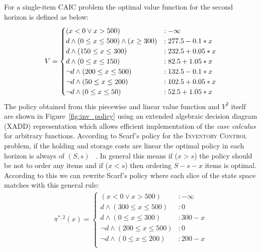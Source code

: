 \documentclass[twoside,11pt]{article}
\newcommand{\InventoryControl}{\textsc{Inventory Control }}
\begin{document}
For a single-item CAIC problem the optimal value function for the second horizon is defined as below:
\vspace{-3mm}
\begin{align}
V = \begin{cases}
(x < 0 \vee x>500) &: -\infty \\
d \land (0 \leq x \leq 500) \land (x \geq 300) &:  277.5 - 0.1 * x \\
d \land (150 \leq x \leq 300) &:  232.5 + 0.05 * x \\
d \land ( 0 \leq x \leq 150) &:  82.5 + 1.05 * x \\
\neg d \land (200 \leq x \leq 500)  &:  132.5 - 0.1 * x \\
\neg d \land (50 \leq x \leq 200) &: 102.5 + 0.05 * x \\
\neg d \land (0 \leq x \leq 50) &:  52.5 + 1.05 * x \\
\end{cases} \label{eq:vfun_inv}
\vspace{-7mm}
\end{align}
The policy obtained from this piecewise and linear value function and $V^2$ itself are shown in Figure~\ref{fig:inv_policy} using an extended algebraic decision diagram (XADD) representation which allows efficient implementation of the \emph{case calculus} for arbitrary functions. According to Scarf's policy for the \InventoryControl problem, if the holding and storage costs are linear the optimal policy in each horizon is always of $(S,s)$ ~\cite{Scarf_Karlin58}. In general this means if ($x>s$) the policy should be not to order any items and if ($x<s$) then ordering $S-s-x$ items is optimal. 
According to this we can rewrite Scarf's policy where each slice of the state space matches with this general rule: 
\begin{align}
\pi^{*,2}(x) = 
\begin{cases}
(x < 0 \vee x>500) &: -\infty \\
d \land (300 \leq x \leq 500)  &:  0 \\
d \land (0 \leq x \leq 300) &:  300 - x \\
\neg d \land (200 \leq x \leq 500) &:  0 \\
\neg d \land (0 \leq x \leq 200) &:  200 - x \\
\end{cases}\nonumber
\end{align}
\end{document}
